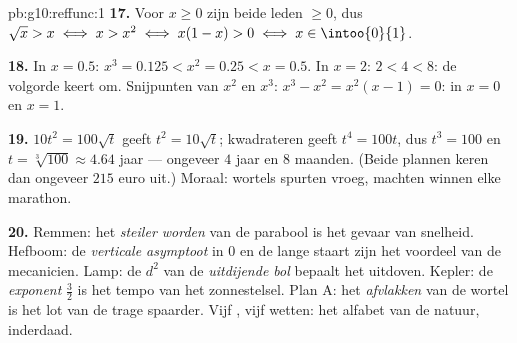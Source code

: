 \begin{solution}{pb:g10:reffunc:1}
\textbf{17.} Voor $x \geq 0$ zijn beide leden $\geq 0$, dus
$\sqrt x > x \iff x > x^2 \iff x(1 - x) > 0 \iff x \in \intoo{0}{1}$.

\textbf{18.} In $x = 0.5$: $x^3 = 0.125 < x^2 = 0.25 < x = 0.5$. In $x = 2$:
$2 < 4 < 8$: de volgorde keert om. Snijpunten van $x^2$ en $x^3$:
$x^3 - x^2 = x^2(x - 1) = 0$: in $x = 0$ en $x = 1$.

\textbf{19.} $10t^2 = 100\sqrt t$ geeft $t^2 = 10\sqrt t$; kwadrateren geeft
$t^4 = 100t$, dus $t^3 = 100$ en $t = \sqrt[3]{100} \approx 4.64$ jaar ---
ongeveer $4$ jaar en $8$ maanden. (Beide plannen keren dan ongeveer $215$
euro uit.) Moraal: wortels spurten vroeg, machten winnen elke marathon.

\textbf{20.} Remmen: het \emph{steiler worden} van de parabool is het gevaar
van snelheid. Hefboom: de \emph{verticale asymptoot} in $0$ en de lange
staart zijn het voordeel van de mecanicien. Lamp: de $d^2$ van de
\emph{uitdijende bol} bepaalt het uitdoven. Kepler: de \emph{exponent}
$\frac32$ is het tempo van het zonnestelsel. Plan A: het \emph{afvlakken}
van de wortel is het lot van de trage spaarder. Vijf , vijf wetten:
het alfabet van de natuur, inderdaad.
\end{solution}

